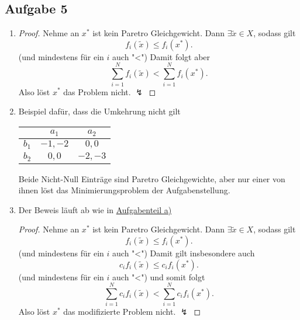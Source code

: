\subsection{Aufgabe 5}
\label{sec:Aufgabe 5}
 \begin{enumerate}[label=\alph{enumi})]
 	\item 
		\begin{proof}
		\label{thm:proof5a}
		Nehme an $x^{*}$ ist kein Paretro Gleichgewicht. Dann $\exists \tilde{x}\in X$, sodass gilt
		\[
			f_{i}(\tilde{x}) \leq f_{i}(x^{*})
		.\] (und mindestens für ein $i$ auch "<")
		Damit folgt aber
		\[
			\sum_{i=1}^{N}{f_{i}(\tilde{x})}<\sum_{i=1}^{N}{f_{i}(x^{*})}
		.\] 
		Also löst $x^{*}$ das Problem nicht. $\lightning$
		\end{proof}
	\item Beispiel dafür, dass die Umkehrung nicht gilt

			\begin{center}
				\begin{tabular}{c|cc}
					& $a_1$ & $a_2$ \\ \hline
					$b_1$ & $-1,-2$ & $0,0$ \\
					$b_2$ & $0,0$ & $-2,-3$
				\end{tabular}
			\end{center}

		Beide Nicht-Null Einträge sind Paretro Gleichgewichte, aber nur einer von ihnen löst das Minimierungsproblem der Aufgabenstellung.

	\item Der Beweis läuft ab wie in \href{thm:proof5a}{Aufgabenteil a)} 
		\begin{proof}
		\label{thm:proof5c}
		Nehme an $x^{*}$ ist kein Paretro Gleichgewicht. Dann $\exists \tilde{x}\in X$, sodass gilt
		\[
			f_{i}(\tilde{x}) \leq f_{i}(x^{*})
		.\] (und mindestens für ein $i$ auch "<")
		Damit gilt insbesondere auch
		\[
			c_{i}f_{i}(\tilde{x}) \leq c_{i}f_{i}(x^{*})
		.\] (und mindestens für ein $i$ auch "<")
		und somit folgt
		\[
			\sum_{i=1}^{N}{c_{i}f_{i}(\tilde{x})}<\sum_{i=1}^{N}{c_{i}f_{i}(x^{*})}
		.\] 
		Also löst $x^{*}$ das modifizierte Problem nicht. $\lightning$
		\end{proof}

 \end{enumerate}
 

